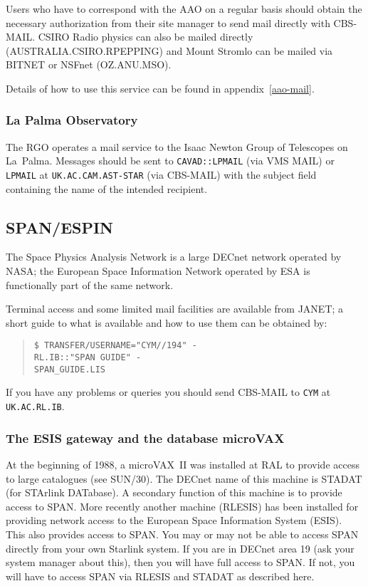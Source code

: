 Users who have to correspond with the AAO on a regular basis should obtain
the necessary authorization from their site manager to send mail directly
with CBS-MAIL. CSIRO Radio physics can also be mailed directly
(AUSTRALIA.CSIRO.RPEPPING) and Mount Stromlo can be mailed via BITNET or NSFnet
(OZ.ANU.MSO).

Details of how to use this service can be found in appendix~\ref{aao-mail}.

\subsubsection{La Palma Observatory}

The RGO operates a mail service to the Isaac Newton Group of Telescopes on
La~Palma. Messages should be sent to {\tt CAVAD::LPMAIL} (via VMS MAIL) or
{\tt LPMAIL} at {\tt UK.AC.CAM.AST-STAR} (via CBS-MAIL)
with the subject field containing the name of the intended recipient.

\subsection{SPAN/ESPIN}

\label{SPAN}
The Space Physics Analysis Network is a large DECnet network operated by NASA;
the European Space Information Network operated by ESA is functionally part of
the same network.

Terminal access and some limited mail facilities are available from JANET; a
short guide to what is available and how to use them can be obtained by:
\begin{quote}
{\tt \$ TRANSFER/USERNAME="CYM//194" -\\
\hspace*{30mm}RL.IB::"SPAN GUIDE" -\\
\hspace*{30mm}SPAN\_GUIDE.LIS}
\end{quote}
If you have any problems or queries you should send CBS-MAIL to {\tt CYM}
at {\tt UK.AC.RL.IB}.

\subsubsection{The ESIS gateway and the database microVAX}
\label{RLESIS}
At the beginning of 1988, a microVAX~II was installed at RAL to provide access
to large catalogues (see SUN/30). The DECnet name of this machine is STADAT
(for STArlink DATabase). A secondary function of this machine is to provide
access to SPAN. More recently another machine (RLESIS) has been installed for
providing network access to the European Space Information System (ESIS). This
also provides access to SPAN. You may or may not be able to access SPAN
directly from your own Starlink system. If you are in DECnet area 19 (ask your
system manager about this), then you will have full access to SPAN. If not, you
will have to access SPAN via RLESIS and STADAT as described here.

